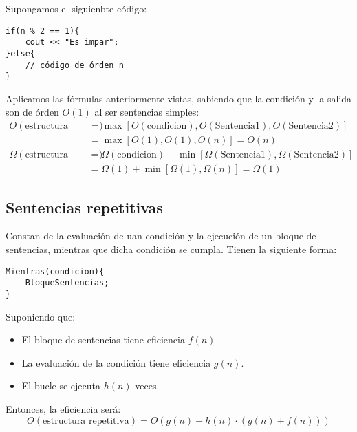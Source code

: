 \begin{ejemplo} Supongamos el siguienbte código:
\begin{listing}[H]
\begin{verbatim}
if(n % 2 == 1){
    cout << "Es impar";
}else{
    // código de órden n
}
\end{verbatim}
\end{listing}
Aplicamos las fórmulas anteriormente vistas, sabiendo que la condición y la salida son de órden $O(1)$ al ser sentencias simples:
\begin{align*}
    O(\text{estructura condicional}) &= \max\left[O(\text{condicion}), O(\text{Sentencia1}), O(\text{Sentencia2})\right] \\
                                     &= \max\left[O(1), O(1), O(n)\right] = O(n)
\end{align*}
\begin{align*}
    \Omega(\text{estructura condicional}) &= \Omega(\text{condicion}) + \min\left[\Omega(\text{Sentencia1}), \Omega(\text{Sentencia2})\right] \\
                                          &= \Omega(1) + \min\left[\Omega(1), \Omega(n)\right] = \Omega(1)
\end{align*}

\end{ejemplo}

\subsection{Sentencias repetitivas}
Constan de la evaluación de uan condición y la ejecución de un bloque de sentencias, mientras que dicha condición se cumpla. Tienen la siguiente forma:
\begin{listing}[H]
\begin{verbatim}
Mientras(condicion){
    BloqueSentencias;
}
\end{verbatim}
\end{listing}
Suponiendo que:
\begin{itemize}
\item El bloque de sentencias tiene eficiencia $f(n)$.
\item La evaluación de la condición tiene eficiencia $g(n)$.
\item El bucle se ejecuta $h(n)$ veces.
\end{itemize}
Entonces, la eficiencia será:
\begin{equation*}
O(\text{estructura repetitiva}) = O(g(n) + h(n) \cdot (g(n)+f(n)))
\end{equation*}

